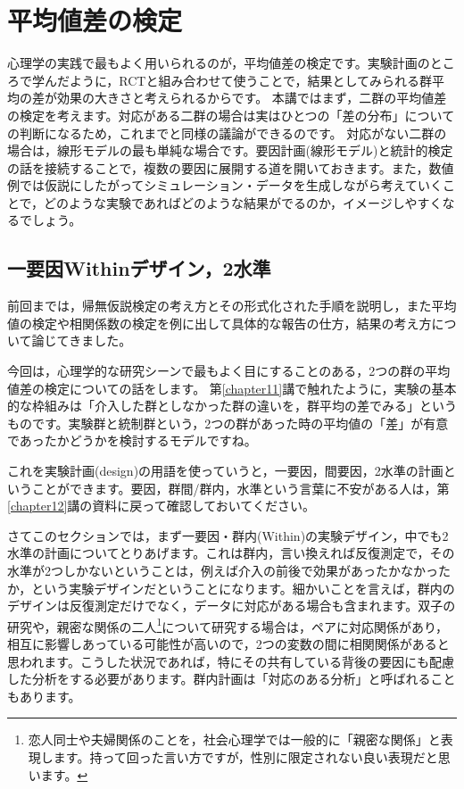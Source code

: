 \documentclass{ltjsarticle}
\begin{document}
\chapter{平均値差の検定}
\label{chapter19}
心理学の実践で最もよく用いられるのが，平均値差の検定です。実験計画のところで学んだように，RCTと組み合わせて使うことで，結果としてみられる群平均の差が効果の大きさと考えられるからです。
本講ではまず，二群の平均値差の検定を考えます。対応がある二群の場合は実はひとつの「差の分布」についての判断になるため，これまでと同様の議論ができるのです。
対応がない二群の場合は，線形モデルの最も単純な場合です。要因計画(線形モデル)と統計的検定の話を接続することで，複数の要因に展開する道を開いておきます。また，数値例では仮説にしたがってシミュレーション・データを生成しながら考えていくことで，どのような実験であればどのような結果がでるのか，イメージしやすくなるでしょう。

\section{一要因Withinデザイン，2水準}
前回までは，帰無仮説検定の考え方とその形式化された手順を説明し，また平均値の検定や相関係数の検定を例に出して具体的な報告の仕方，結果の考え方について論じてきました。

今回は，心理学的な研究シーンで最もよく目にすることのある，2つの群の平均値差の検定についての話をします。
第\ref{chapter11}講で触れたように，実験の基本的な枠組みは「介入した群としなかった群の違いを，群平均の差でみる」というものです。実験群と統制群という，2つの群があった時の平均値の「差」が有意であったかどうかを検討するモデルですね。

これを実験計画(design)の用語を使っていうと，一要因，間要因，2水準の計画ということができます。要因，群間/群内，水準という言葉に不安がある人は，第\ref{chapter12}講の資料に戻って確認しておいてください。

さてこのセクションでは，まず一要因・群内(Within)の実験デザイン，中でも2水準の計画についてとりあげます。これは群内，言い換えれば反復測定で，その水準が2つしかないということは，例えば介入の前後で効果があったかなかったか，という実験デザインだということになります。細かいことを言えば，群内のデザインは反復測定だけでなく，データに対応がある場合も含まれます。双子の研究や，親密な関係の二人\footnote{恋人同士や夫婦関係のことを，社会心理学では一般的に「親密な関係」と表現します。持って回った言い方ですが，性別に限定されない良い表現だと思います。}について研究する場合は，ペアに対応関係があり，相互に影響しあっている可能性が高いので，2つの変数の間に相関関係があると思われます。こうした状況であれば，特にその共有している背後の要因にも配慮した分析をする必要があります。群内計画は「対応のある分析」と呼ばれることもあります。
\end{document}
